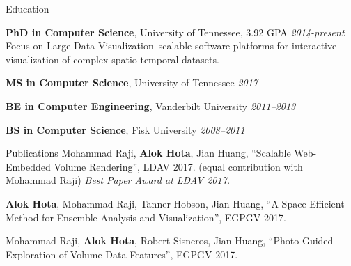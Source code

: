 \documentclass{resume} %
\begin{document}

\begin{rSection}{Education}

{{\bf PhD in Computer Science}, University of Tennessee, 3.92 GPA} \hfill {\em 2014-present} \\ 
Focus on Large Data Visualization--scalable software platforms for interactive\\visualization of complex spatio-temporal datasets.

{{\bf MS in Computer Science}, University of Tennessee} \hfill {\em 2017}

{{\bf BE in Computer Engineering}, Vanderbilt University} \hfill {\em 2011--2013}

{{\bf BS in Computer Science}, Fisk University} \hfill {\em 2008--2011}

\end{rSection}


\begin{rSection}{Publications}
    Mohammad Raji, \textbf{Alok Hota}, Jian Huang, ``Scalable Web-Embedded Volume Rendering'', LDAV 2017. (equal contribution with Mohammad Raji)
    \textit{Best Paper Award at LDAV 2017.} \href{http://web.eecs.utk.edu/~ahota/pdfs/tapestry-ldav-2017.pdf}{\faFileTextO}
    
    \textbf{Alok Hota}, Mohammad Raji, Tanner Hobson, Jian Huang, ``A Space-Efficient Method for Ensemble Analysis and Visualization'', EGPGV 2017. \href{http://web.eecs.utk.edu/~ahota/pdfs/nea-egpgv-2017.pdf}{\faFileTextO}
    
    Mohammad Raji, \textbf{Alok Hota}, Robert Sisneros, Jian Huang, ``Photo-Guided Exploration of Volume Data Features'', EGPGV 2017. \href{http://web.eecs.utk.edu/~ahota/pdfs/photoguided-egpgv-2017.pdf}{\faFileTextO}
\end{rSection}

\end{document}

